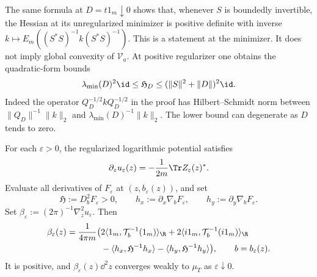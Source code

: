 The same formula at $D=t1_m\downarrow0$ shows that, whenever $S$ is boundedly invertible, the Hessian at its unregularized minimizer is positive definite with inverse $k\mapsto E_m((S^*S)^{-1}k(S^*S)^{-1})$.
This is a statement at the minimizer.
It does not imply global convexity of $\mathcal V_a$.
At positive regularizer one obtains the quadratic-form bounds
\[
 \lambda_{\min}(D)^2\id\le\mathfrak H_D
       \le(\|S\|^2+\|D\|)^2\id.
\]
Indeed the operator $Q_D^{-1/2}kQ_D^{-1/2}$ in the proof has Hilbert--Schmidt norm between $\|Q_D\|^{-1}\|k\|_2$ and $\lambda_{\min}(D)^{-1}\|k\|_2$.
The lower bound can degenerate as $D$ tends to zero.

\begin{proposition}\label{prop:brown-optimizer-density}
For each $\varepsilon>0$, the regularized logarithmic potential satisfies
\begin{equation}\label{eq:brown-envelope-transform}
 \partial_z u_\varepsilon(z)
       =-\frac1{2m}\Tr Z_\varepsilon(z)^*.
\end{equation}
Evaluate all derivatives of $F_\varepsilon$ at $(z,b_\varepsilon(z))$, and set
\[
 \mathfrak H:=D_b^2F_\varepsilon>0,\qquad
 h_x:=\partial_x\nabla_bF_\varepsilon,
 \qquad h_y:=\partial_y\nabla_bF_\varepsilon.
\]
Set $\beta_\varepsilon:=(2\pi)^{-1}\nabla_z^2u_\varepsilon$.
Then
\begin{equation}\label{eq:brown-hessian-density}
 \begin{split}
 \beta_\varepsilon(z)=\frac1{4\pi m}\bigl(&
  2\langle1_m,\mathcal T_b^{-1}(1_m)\rangle_{\R}
 +2\langle i1_m,\mathcal T_b^{-1}(i1_m)\rangle_{\R}\\
 &-\langle h_x,\mathfrak H^{-1}h_x\rangle
  -\langle h_y,\mathfrak H^{-1}h_y\rangle\bigr),
 \qquad b=b_\varepsilon(z).
 \end{split}
\end{equation}
It is positive, and $\beta_\varepsilon(z)\dd^2z$ converges weakly to $\mu_T$ as $\varepsilon\downarrow0$.
\end{proposition}
